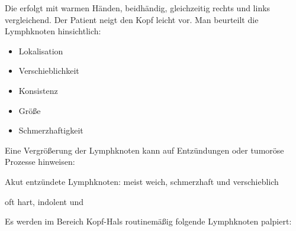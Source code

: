  


{Die  erfolgt  mit warmen
Händen, beidhändig, gleichzeitig rechts und links
vergleichend. Der Patient neigt den Kopf leicht vor.
Man beurteilt die Lymphknoten hinsichtlich:

\begin{itemize}
  \item Lokalisation
  \item Verschieblichkeit
  \item Konsistenz
  \item Größe
  \item Schmerzhaftigkeit
\end{itemize}

\noindent Eine Vergrößerung der Lymphknoten kann
auf Entzündungen oder tumoröse Prozesse hinweisen:

\begin{compactitem}
  \item Akut entzündete Lymphknoten: meist weich, schmerzhaft und
  verschieblich
  \item {} oft hart, indolent und
\end{compactitem}
}{%
\begin{PkuBefunde}[]
  \item[\SymbolPkuNormal] 
  \item[\SymbolFindingPathological]
\end{PkuBefunde}
}{}{}{}



\bigskip

Es werden im Bereich Kopf-Hals routinemäßig folgende Lymphknoten
palpiert:


